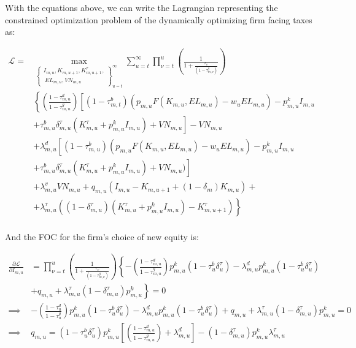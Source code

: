 \documentclass[letterpaper,12pt]{article}
\theoremstyle{definition}
\begin{document}
\begin{spacing}{1.5}
With the equations above, we can write the Lagrangian representing the constrained optimization problem of the dynamically optimizing firm facing taxes as: 

\begin{equation}
\label{eqn:firm_lagrange_tax2}
\begin{split}
\mathcal{L} = &  \max_{\left\{\substack{I_{m,u},K_{m,u+1},K^{\tau}_{m,u+1},\\\ EL_{m,u},VN_{m,u}}\right\}_{u=t}^{\infty}} \sum_{u=t}^{\infty} \prod_{\nu=t}^{u} \left(\frac{1}{1+\frac{r_{v}}{(1-\tau^{g}_{m,\nu})}}\right)\\
& \left\{ \left(\frac{1-\tau^{d}_{m,u}}{1-\tau^{g}_{m,u}}\right) \left[(1-\tau^{b}_{m,t})\left(p_{m,u}F(K_{m,u},EL_{m,u}) - w_{u}EL_{m,u}\right) -p^{k}_{m,u}I_{m,u}   \right. \right.\\
       & \left.\left. + \tau^{b}_{m,u}\delta^{\tau}_{m,u}(K^{\tau}_{m,u}+p^{k}_{m,u}I_{m,u}) +VN_{m,u}\right]  - VN_{m,u} \right. \\
       &+\left. \lambda^{d}_{m,u}\left[(1-\tau^{b}_{m,u})(p_{m,u}F(K_{m,u},EL_{m,u}) - w_{u}EL_{m,u}) -p^{k}_{m,u}I_{m,u} \right.\right. \\ 
       & \left.\left. + \tau^{b}_{m,u}\delta^{\tau}_{m,u}(K^{\tau}_{m,u}+p^{k}_{m,u}I_{m,u}) +VN_{m,u})\right] \right. \\
       &+ \left. \lambda^{v}_{m,u}VN_{m,u} + q_{m,u}(I_{m,u} - K_{m,u+1} +(1-\delta_{m})K_{m,u}) + \right. \\
       & +\left. \lambda^{\tau}_{m,u}((1-\delta^{\tau}_{m,u})(K^{\tau}_{m,u}+p^{k}_{m,u}I_{m,u}) - K^{\tau}_{m,u+1})\right\}  \\
\end{split}
\end{equation}

And the FOC for the firm's choice of new equity is:

\begin{equation}
\label{eqn:lagrange_foc_i_tax}
\begin{split}
 \frac{\partial \mathcal{L}}{\partial I_{m,u}} & =   \prod_{\nu=t}^{u} \left(\frac{1}{1+\frac{r_{\nu}}{(1-\tau^{g}_{m,\nu})}}\right) \left\{-\left(\frac{1-\tau^{d}_{m,u}}{1-\tau^{g}_{m,u}}\right)p^{k}_{m,u}(1-\tau^{b}_{u}\delta^{\tau}_{u}) - \lambda^{d}_{m,u}p^{k}_{m,u}(1-\tau^{b}_{u}\delta^{\tau}_{u}) \right. \\
 & \left. + q_{m,u}  + \lambda^{\tau}_{m,u}(1-\delta^{\tau}_{m,u})p^{k}_{m,u} \right\} = 0 \\
\implies &-\left(\frac{1-\tau^{d}_{u}}{1-\tau^{g}_{u}}\right)p^{k}_{m,u}(1-\tau^{b}_{u}\delta^{\tau}_{u}) - \lambda^{d}_{m,u}p^{k}_{m,u}(1-\tau^{b}_{u}\delta^{\tau}_{u}) + q_{m,u}  + \lambda^{\tau}_{m,u}(1-\delta^{\tau}_{m,u})p^{k}_{m,u}  = 0 \\
\implies &  q_{m,u} = (1-\tau^{b}_{u}\delta^{\tau}_{u})p^{k}_{m,u}\left[\left(\frac{1-\tau^{d}_{m,u}}{1-\tau^{g}_{m,u}}\right) + \lambda^{d}_{m,u}\right] - (1-\delta^{\tau}_{m,u})p^{k}_{m,u}\lambda^{\tau}_{m,u}   \\
\end{split}
\end{equation}



\end{spacing}
\end{document}
